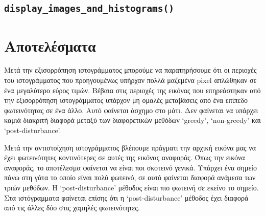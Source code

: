 \documentclass{article}
\begin{document}
\subsection{\texttt{display\_images\_and\_histograms()}}\label{helpfunc-display}
\section{Αποτελέσματα}
Μετά την εξισορρόπηση ιστογράμματος μπορούμε να παρατηρήσουμε ότι οι περιοχές 
του ιστογράμματος που προηγουμένως υπήρχαν πολλά μαζεμένα pixel απλώθηκαν σε ένα 
μεγαλύτερο εύρος τιμών. Βέβαια στις περιοχές της εικόνας που επηρεάστηκαν από
την εξισορρόπηση ιστογράμματος υπάρχον μη ομαλές μεταβάσεις από ένα επίπεδο
φωτεινότητας σε ένα άλλο. Αυτό φαίνεται άσχημο στο μάτι. Δεν φαίνεται να υπάρχει 
καμιά διακριτή διαφορά μεταξύ των διαφορετικών μεθόδων `greedy', `non-greedy' και
`post-disturbance'.

Μετά την αντιστοίχηση ιστογράμματος βλέπουμε πράγματι την αρχική εικόνα μας να 
έχει φωτεινότητες κοντινότερες σε αυτές της εικόνας αναφοράς. Όπως την εικόνα
αναφοράς, το αποτέλεσμα φαίνεται να είναι ποι σκοτεινό γενικά. Υπάρχει ένα 
σημείο πάνω στη γάτα το οποίο είναι πολύ φωτεινό, σε αυτό φαίνεται διαφορά 
ανάμεσα των τριών μεθόδων. Η `post-disturbance' μέθοδος είναι πιο φωτεινή σε
εκείνο το σημείο. Στα ιστόγραμματα φαίνεται επίσης ότι η `post-disturbance'
μέθοδος έχει διαφορά από τις άλλες δύο στις χαμηλές φωτεινότητες.
\end{document}
